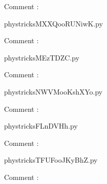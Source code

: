     Comment : 

    \clearpage
    


    \newcommand{\CaptionFigMXXQooRUNiwK}{<+Type your caption here+>}
    \begin{center}
        
    \end{center}
    phystricksMXXQooRUNiwK.py

    Comment : 

    \clearpage
    


    \newcommand{\CaptionFigMEzTDZC}{<+Type your caption here+>}
    \begin{center}
        
    \end{center}
    phystricksMEzTDZC.py

    Comment : 

    \clearpage
    


    \newcommand{\CaptionFigNWVMooKshXYo}{<+Type your caption here+>}
    \begin{center}
        
    \end{center}
    phystricksNWVMooKshXYo.py

    Comment : 

    \clearpage
    


    \newcommand{\CaptionFigFLnDVHh}{<+Type your caption here+>}
    \begin{center}
        
    \end{center}
    phystricksFLnDVHh.py

    Comment : 

    \clearpage
    


    \newcommand{\CaptionFigTFUFooJKyBhZ}{<+Type your caption here+>}
    \begin{center}
        
    \end{center}
    phystricksTFUFooJKyBhZ.py

    Comment : 

    \clearpage
    

